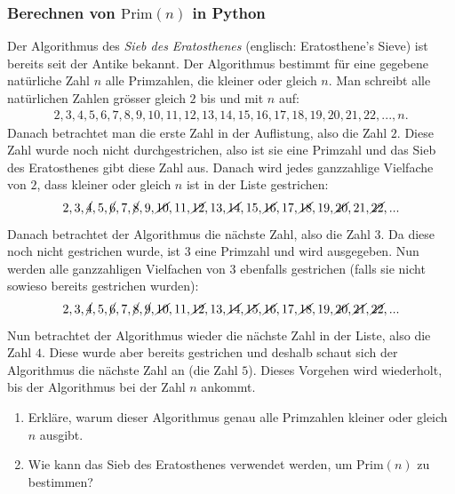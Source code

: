 \subsubsection{Berechnen von  $\text{Prim}(n)$ in Python}
Der Algorithmus des \textit{Sieb des Eratosthenes} (englisch: Eratosthene's Sieve) ist bereits seit der Antike bekannt. Der Algorithmus bestimmt für eine gegebene natürliche Zahl $n$ alle Primzahlen, die kleiner oder gleich $n$. Man schreibt alle natürlichen Zahlen grösser gleich $2$ bis und mit $n$ auf:
\begin{align*}
    2, 3, 4, 5, 6, 7, 8, 9, 10, 11, 12, 13, 14, 15, 16, 17, 18, 19, 20, 21, 22, ..., n.
\end{align*}
Danach betrachtet man die erste Zahl in der Auflistung, also die Zahl $2$. Diese Zahl wurde noch nicht durchgestrichen, also ist sie eine Primzahl und das Sieb des Eratosthenes gibt diese Zahl aus. Danach wird jedes ganzzahlige Vielfache von $2$, dass kleiner oder gleich $n$ ist in der Liste gestrichen:
\begin{align*}
    2, 3, \cancel{4}, 5, \cancel{6}, 7, \cancel{8}, 9, \cancel{10}, 11, \cancel{12}, 13, \cancel{14}, 15, \cancel{16}, 17, \cancel{18}, 19, \cancel{20}, 21, \cancel{22}, ...
\end{align*}
Danach betrachtet der Algorithmus die nächste Zahl, also die Zahl $3$. Da diese noch nicht gestrichen wurde, ist $3$ eine Primzahl und wird ausgegeben. Nun werden alle ganzzahligen Vielfachen von $3$ ebenfalls gestrichen (falls sie nicht sowieso bereits gestrichen wurden):
\begin{align*}
    2, 3, \cancel{4}, 5, \cancel{6}, 7, \cancel{8}, \cancel{9}, \cancel{10}, 11, \cancel{12}, 13, \cancel{14}, \cancel{15}, \cancel{16}, 17, \cancel{18}, 19, \cancel{20}, \cancel{21}, \cancel{22}, ...
\end{align*}
Nun betrachtet der Algorithmus wieder die nächste Zahl in der Liste, also die Zahl $4$. Diese wurde aber bereits gestrichen und deshalb schaut sich der Algorithmus die nächste Zahl an (die Zahl $5$). Dieses Vorgehen wird wiederholt, bis der Algorithmus bei der Zahl $n$ ankommt.
\begin{Exercise}
\begin{enumerate}[label=(\alph*)]
\item Erkläre, warum dieser Algorithmus genau alle Primzahlen kleiner oder gleich $n$ ausgibt.
\item Wie kann das Sieb des Eratosthenes verwendet werden, um $\text{Prim}(n)$ zu bestimmen?
\end{enumerate}
\end{Exercise}


